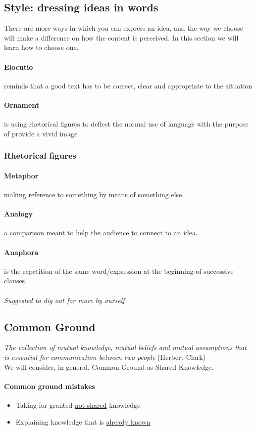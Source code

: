 \documentclass{article}
\begin{document}
\subsection{Style: dressing ideas in words}
There are more ways in which you can express an idea, and the way we choose will make a difference on how the content is perceived. In this section we will learn how to choose one.
\paragraph{Elocutio} reminds that  a good text has to be correct, clear and appropriate to the situation
\paragraph{Ornament} is using  rhetorical figures to deflect the normal use of language with the purpose of provide a vivid image
\subsubsection{Rhetorical figures}
\paragraph{Metaphor} making reference to something by means of something else.
\paragraph{Analogy} a comparison meant to help the audience to connect to an idea.
\paragraph{Anaphora} is the repetition of the same word/expression at the beginning of successive clauses.
\paragraph{}\textit{Suggested to dig out for more by ourself}


\subsection{Common Ground}
\textit{The collection of mutual knowledge, mutual beliefs and mutual assumptions that is essential for communication between two people} (Herbert Clark)\\
We will consider, in general, Common Ground as Shared Knowledge.
\paragraph{Common ground mistakes}
\begin{itemize}
\item Taking for granted \underline{not shared} knowledge
\item Explaining knowledge that is \underline{already known}
\end{itemize}
\end{document}
